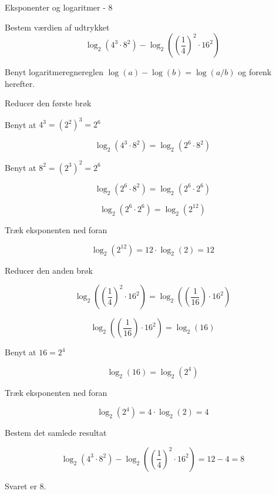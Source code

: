 \documentclass{article}
\begin{document}
\newpage
\begin{exercise}{Eksponenter og logaritmer - 8}

Bestem værdien af udtrykket
\[
\log_2\left( 4^3 \cdot 8^2 \right) - \log_2 \left( \left(\frac{1}{4}\right)^2 \cdot 16^2\right)
\]


\hint
Benyt logaritmeregnereglen $\log(a) - \log(b) = \log(a/b)$ og forenk herefter.

\hint
Reducer den første brøk

\hint
Benyt at $4^3 = (2^2)^3 = 2^6$

\hint
\[
\log_2\left( 4^3 \cdot 8^2 \right) = \log_2\left( 2^6 \cdot 8^2 \right)
\]

\hint
Benyt at $8^2 = (2^3)^2 = 2^6$

\hint
\[
\log_2\left( 2^6 \cdot 8^2 \right) = \log_2\left( 2^6 \cdot 2^6 \right)
\]

\hint
\[
\log_2\left( 2^6 \cdot 2^6 \right) = \log_2 (2^{12})
\]


\hint
Træk eksponenten ned foran

\hint
\[
\log_2\left( 2^{12} \right) = 12 \cdot \log_2(2) = 12
\]

\hint
Reducer den anden brøk

\hint
\[
 \log_2\left( \left(\frac{1}{4}\right)^2 \cdot 16^2\right) = \log_2\left( \left(\frac{1}{16}\right) \cdot 16^2\right)
\]

\hint
\[
\log_2\left( \left(\frac{1}{16}\right) \cdot 16^2\right) = \log_2\left(16 \right)
\]

\hint
Benyt at $16 = 2^4$

\hint
\[
\log_2\left(16 \right) = \log_2\left(2^4 \right)
\]

\hint
Træk eksponenten ned foran

\hint
\[
\log_2\left( 2^{4} \right) = 4 \cdot \log_2(2) = 4
\]

\hint
Bestem det samlede resultat

\hint
\[
\log_2\left( 4^3 \cdot 8^2 \right) - \log_2 \left( \left(\frac{1}{4}\right)^2 \cdot 16^2\right) = 12 - 4 = 8
\]

\hint
Svaret er $8$.

\end{exercise}

\newpage
\end{document}
